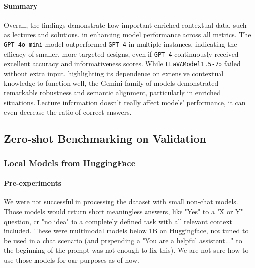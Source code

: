 \documentclass{article}
\begin{document}
\paragraph{Summary}
Overall, the findings demonstrate how important enriched contextual data, such as lectures and solutions, in enhancing model performance across all metrics. The \texttt{GPT-4o-mini} model outperformed \texttt{GPT-4} in multiple instances, indicating the efficacy of smaller, more targeted designs, even if \texttt{GPT-4} continuously received excellent accuracy and informativeness scores. While \texttt{LLaVAModel1.5-7b} failed without extra input, highlighting its dependence on extensive contextual knowledge to function well, the Gemini family of models demonstrated remarkable robustness and semantic alignment, particularly in enriched situations.
Lecture information doesn’t really affect models’ performance, it can even decrease the ratio of correct answers.


\subsection{Zero-shot Benchmarking on Validation}
\subsubsection{Local Models from HuggingFace}

\paragraph{Pre-experiments} We were not successful in processing the dataset with small non-chat models. Those  models would return short meaningless answers, like "Yes" to a "X or Y" question, or "no idea" to a completely defined task with all relevant context included. These were multimodal models below 1B on Huggingface, not tuned to be used in a chat scenario (and prepending a "You are a helpful assistant..." to the beginning of the prompt was not enough to fix this).  We are not sure how to use those models for our purposes as of now. 

\end{document}
